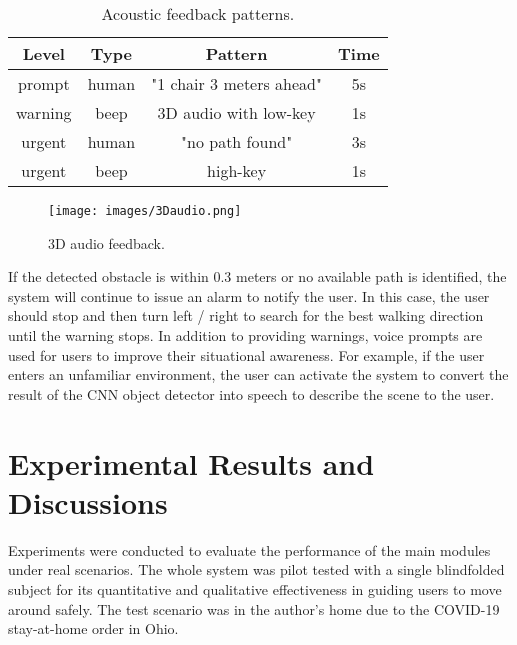\documentclass{ieeeaccess}
\begin{document}
\begin{table}[t]
\centering
\caption{Acoustic feedback patterns.}
\label{tab:acoustic pattern}
\begin{tabular}{|c|c|c|c|}
\hline
Level   & Type  & Pattern                & Time \\ \hline
prompt  & human & "1 chair 3 meters ahead" & 5s   \\ \hline
warning & beep  & 3D audio with low-key             & 1s   \\ \hline
urgent  & human & "no path found"          & 3s   \\ \hline
urgent  & beep  & high-key              & 1s   \\ \hline
\end{tabular}
\end{table} 

\begin{figure}
    \centering
    \texttt{[image: images/3Daudio.png]}
    \caption{3D audio feedback.}
    \label{fig:3Daudio}
\end{figure}
If the detected obstacle is within 0.3 meters or no available path is identified, the system will continue to issue an alarm to notify the user. In this case, the user should stop and then turn left / right to search for the best walking direction until the warning stops. In addition to providing warnings, voice prompts are used for users to improve their situational awareness. For example, if the user enters an unfamiliar environment, the user can activate the system to convert the result of the CNN object detector into speech to describe the scene to the user.



\section{Experimental Results and Discussions} \label{section:experiment}

 Experiments were conducted to evaluate the performance of the main modules under real scenarios. The whole system was pilot tested with a single blindfolded subject for its quantitative and qualitative effectiveness in guiding users to move around safely. The test scenario was in the author's home due to the COVID-19 stay-at-home order in Ohio.


 
\end{document}
